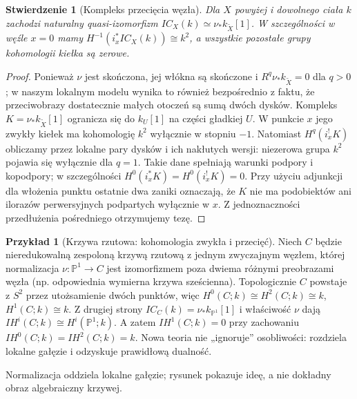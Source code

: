 \documentclass[11pt,a4paper,oneside]{report}
\theoremstyle{plain}
\newtheorem{stwierdzenie}[twierdzenie]{Stwierdzenie}
\theoremstyle{definition}
\newtheorem{przyklad}[twierdzenie]{Przykład}
\theoremstyle{remark}
\begin{document}
\begin{stwierdzenie}[Kompleks przecięcia węzła]
\label{prop:node-ic-xiii}
Dla $X$ powyżej i dowolnego ciała $k$ zachodzi
naturalny quasi-izomorfizm
$IC_X(k)\simeq\nu_*k_{\widetilde X}[1]$.
W szczególności w węźle $x=0$ mamy
$H^{-1}(i_x^*IC_X(k))\cong k^2$,
a wszystkie pozostałe grupy kohomologii kiełka
są zerowe.
\end{stwierdzenie}
\begin{proof}
Ponieważ $\nu$ jest skończona, jej włókna są
skończone i $R^q\nu_*k_{\widetilde X}=0$ dla $q>0$;
w naszym lokalnym modelu wynika to również
bezpośrednio z faktu, że przeciwobrazy dostatecznie
małych otoczeń są sumą dwóch dysków.
Kompleks $K=\nu_*k_{\widetilde X}[1]$ ogranicza się
do $k_U[1]$ na części gładkiej $U$.
W punkcie $x$ jego zwykły kiełek ma kohomologię
$k^2$ wyłącznie w stopniu $-1$. Natomiast
$H^q(i_x^!K)$ obliczamy przez lokalne pary
dysków i ich nakłutych wersji: niezerowa grupa
$k^2$ pojawia się wyłącznie dla $q=1$.
Takie dane spełniają warunki podpory i kopodpory;
w szczególności $H^0(i_x^*K)=H^0(i_x^!K)=0$.
Przy użyciu adjunkcji dla włożenia punktu
ostatnie dwa zaniki oznaczają, że $K$ nie ma
podobiektów ani ilorazów perwersyjnych
podpartych wyłącznie w $x$. Z jednoznaczności
przedłużenia pośredniego otrzymujemy tezę.
\end{proof}

\begin{przyklad}[Krzywa rzutowa: kohomologia zwykła i przecięć]
Niech $C$ będzie nieredukowalną zespoloną
krzywą rzutową z jednym zwyczajnym węzłem,
której normalizacja $\nu:\mathbb P^1\to C$
jest izomorfizmem poza dwiema różnymi preobrazami
węzła (np. odpowiednia wymierna krzywa sześcienna).
Topologicznie $C$ powstaje z $S^2$ przez
utożsamienie dwóch punktów, więc
$H^0(C;k)\cong H^2(C;k)\cong k$,
$H^1(C;k)\cong k$.
Z drugiej strony
$IC_C(k)=\nu_*k_{\mathbb P^1}[1]$ i właściwość $\nu$
dają $IH^i(C;k)\cong H^i(\mathbb P^1;k)$.
A zatem $IH^1(C;k)=0$ przy zachowaniu
$IH^0(C;k)=IH^2(C;k)=k$.
Nowa teoria nie „ignoruje” osobliwości: rozdziela
lokalne gałęzie i odzyskuje prawidłową dualność.
\end{przyklad}

\begin{center}
\par\smallskip\small Normalizacja oddziela lokalne gałęzie; rysunek
pokazuje ideę, a nie dokładny obraz algebraiczny krzywej.
\end{center}
\end{document}
